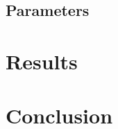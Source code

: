 \documentclass[12pt]{article}
\begin{document}
	

\subsection{Parameters} \label{parameters}
	

\section{Results} \label{results}
	

\section{Conclusion} \label{concluion}


\nocite{*}
\appendix %
\end{document}

